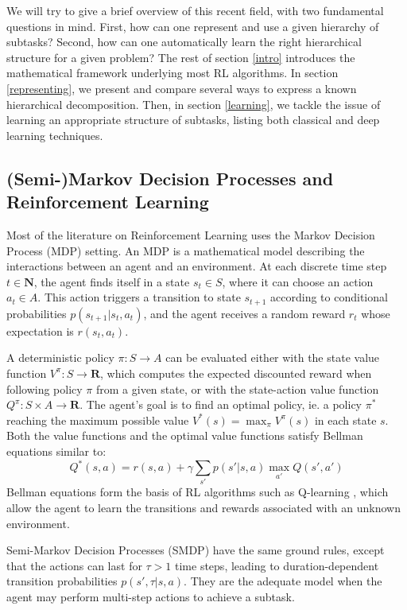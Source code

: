 \documentclass{article}
\newcommand{\Nn}{\mathbf{N}}
\newcommand{\Rr}{\mathbf{R}}
\begin{document}
We will try to give a brief overview of this recent field, with two fundamental questions in mind. First, how can one represent and use a given hierarchy of subtasks?
Second, how can one automatically learn the right hierarchical structure for a given problem? 
The rest of section \ref{intro} introduces the mathematical framework underlying most RL algorithms. In section \ref{representing}, we present and compare several ways to express a known hierarchical decomposition. Then, in section \ref{learning}, we tackle the issue of learning an appropriate structure of subtasks, listing both classical and deep learning techniques.

\subsection{(Semi-)Markov Decision Processes and Reinforcement Learning}

Most of the literature on Reinforcement Learning uses the Markov Decision Process (MDP) setting. An MDP is a mathematical model describing the interactions between an agent and an environment. At each discrete time step $t \in \Nn$, the agent finds itself in a state $s_t \in S$, where it can choose an action $a_t \in A$. This action triggers a transition to state $s_{t+1}$ according to conditional probabilities $p(s_{t+1} | s_t, a_t)$, and the agent receives a random reward $r_t$ whose expectation is $r(s_t, a_t)$.

A deterministic policy $\pi: S \to A$ can be evaluated either with the state value function $V^{\pi}: S \to \Rr$, which computes the expected discounted reward when following policy $\pi$ from a given state, or with the state-action value function $Q^{\pi}: S \times A \to \Rr$. The agent's goal is to find an optimal policy, ie. a policy $\pi^*$ reaching the maximum possible value $V^*(s) = \max_{\pi} V^{\pi}(s)$ in each state $s$. Both the value functions and the optimal value functions satisfy Bellman equations similar to:
\begin{equation}
    Q^* (s, a) = r(s, a) + \gamma \sum_{s'}{p(s' | s, a) \max_{a'}{Q(s', a')}}
\end{equation}
Bellman equations form the basis of RL algorithms such as Q-learning \cite{watkins_q-learning_1992}, which allow the agent to learn the transitions and rewards associated with an unknown environment.

Semi-Markov Decision Processes (SMDP) have the same ground rules, except that the actions can last for $\tau > 1$ time steps, leading to duration-dependent transition probabilities $p(s', \tau | s, a)$. They are the adequate model when the agent may perform multi-step actions to achieve a subtask.
\end{document}
